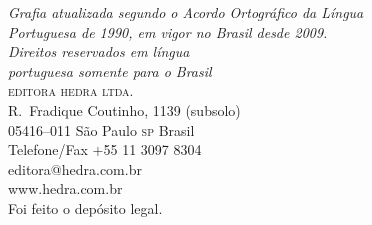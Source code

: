 \bigskip
\textit{Grafia atualizada segundo o Acordo Ortográfico da Língua\\
Portuguesa de 1990, em vigor no Brasil desde 2009.}\\

\vfill
\textit{Direitos reservados em língua\\ 
portuguesa somente para o Brasil}\\

\textsc{editora hedra ltda.}\\
R.~Fradique Coutinho, 1139 (subsolo)\\
05416--011 São Paulo \textsc{sp} Brasil\\
Telefone/Fax +55 11 3097 8304\\\smallskip
editora@hedra.com.br\\
www.hedra.com.br\\

Foi feito o depósito legal.

\endgroup
\pagebreak